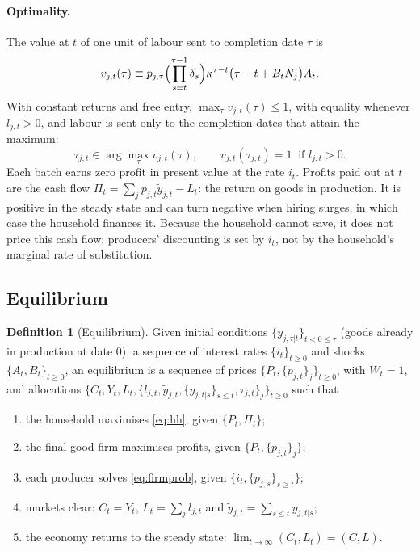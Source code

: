 \documentclass[11pt]{article}
\theoremstyle{definition}
\newtheorem{definition}{Definition}
\begin{document}
\paragraph{Optimality.}
The value at $t$ of one unit of labour sent to completion date $\tau$ is
\begin{equation}\label{eq:value}
  v_{j,t}(\tau)\equiv p_{j,\tau}\Bigl(\prod_{s=t}^{\tau-1}\delta_s\Bigr)\kappa^{\tau-t}\bigl(\tau-t+B_tN_j\bigr)A_t .
\end{equation}
With constant returns and free entry, $\max_\tau v_{j,t}(\tau)\le 1$, with equality whenever
$l_{j,t}>0$, and labour is sent only to the completion dates that attain the maximum:
\begin{equation}\label{eq:zeroprofit}
  \tau_{j,t}\in\arg\max_{\tau}v_{j,t}(\tau),\qquad v_{j,t}(\tau_{j,t})=1\ \text{ if } l_{j,t}>0 .
\end{equation}
Each batch earns zero profit in present value at the rate $i_t$. Profits paid out at $t$ are the cash
flow $\Pi_t=\sum_jp_{j,t}\tilde y_{j,t}-L_t$: the return on goods in production. It is positive in the
steady state and can turn negative when hiring surges, in which case the household finances it.
Because the household cannot save, it does not price this cash flow: producers' discounting is set
by $i_t$, not by the household's marginal rate of substitution.

\subsection{Equilibrium}\label{sec:eq}

\begin{definition}[Equilibrium]\label{def:eq}
Given initial conditions $\{y_{j,\tau|t}\}_{t<0\le\tau}$ (goods already in production at date 0), a
sequence of interest rates $\{i_t\}_{t\ge0}$ and shocks $\{A_t,B_t\}_{t\ge0}$, an equilibrium
is a sequence of prices $\{P_t,\{p_{j,t}\}_{j}\}_{t\ge0}$, with $W_t=1$, and allocations
$\{C_t,Y_t,L_t,\{l_{j,t},\tilde y_{j,t},\{y_{j,t|s}\}_{s\le t},\tau_{j,t}\}_{j}\}_{t\ge0}$ such that
\begin{enumerate}
  \item the household maximises \eqref{eq:hh}, given $\{P_t,\Pi_t\}$;
  \item the final-good firm maximises profits, given $\{P_t,\{p_{j,t}\}_j\}$;
  \item each producer solves \eqref{eq:firmprob}, given $\{i_t,\{p_{j,s}\}_{s\ge t}\}$;
  \item markets clear: $C_t=Y_t$, $L_t=\sum_jl_{j,t}$ and $\tilde y_{j,t}=\sum_{s\le t}y_{j,t|s}$;
  \item the economy returns to the steady state: $\lim_{t\to\infty}(C_t,L_t)=(C,L)$.
\end{enumerate}
\end{definition}
\end{document}
